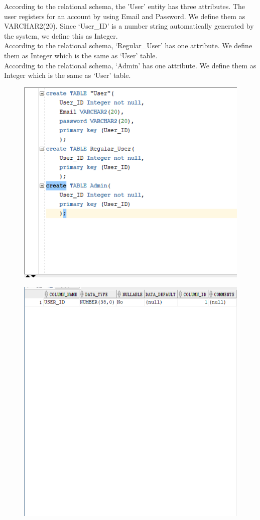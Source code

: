 \documentclass[]{article}
\begin{document}
	\noindent According to the relational schema, the 'User' entity has three attributes. The user registers for an account by using Email and Password. We define them as VARCHAR2(20). Since ‘User\_ID’ is a number string automatically generated by the system, we define this as Integer.  \\
	
	\noindent According to the relational schema, ‘Regular\_User’ has one attribute. We define them as Integer which is the same as ‘User’ table.   \\
	
	\noindent According to the relational schema, ‘Admin’ has one attribute. We define them as Integer which is the same as ‘User’ table.  \\
	
	\begin{figure}[H]
		\centering
		\includegraphics[width=0.8\linewidth, height=0.35\textheight]{../d3-p/part1}
		\caption{}
		\label{fig:part1}
	\end{figure}
	
	\begin{figure}[H]
		\centering
		\includegraphics[width=0.8\linewidth, height=0.3\textheight]{../d3-p/part1-1}
		\caption{}
		\label{fig:part1-1}
	\end{figure}
	
\end{document}
